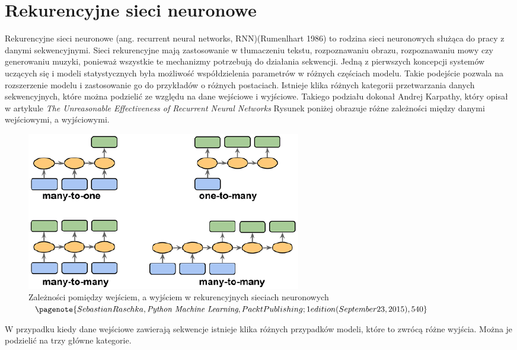 	\section{Rekurencyjne sieci neuronowe}

	Rekurencyjne sieci neuronowe (ang. recurrent neural networks, RNN)(Rumenlhart 1986) to rodzina sieci neuronowych służąca do pracy z danymi sekwencyjnymi. Sieci rekurencyjne mają zastosowanie w tłumaczeniu tekstu, rozpoznawaniu obrazu, rozpoznawaniu mowy czy generowaniu muzyki, ponieważ wszystkie te mechanizmy potrzebują do działania sekwencji. Jedną z pierwszych koncepcji systemów uczących się i modeli statystycznych była możliwość współdzielenia parametrów w różnych częściach modelu. Takie podejście pozwala na rozszerzenie modelu i zastosowanie go do przykładów o różnych postaciach. Istnieje klika różnych kategorii przetwarzania danych sekwencyjnych, które można podzielić ze względu na dane wejściowe i wyjściowe. Takiego podziału dokonał Andrej Karpathy, który opisał w artykule \textit{The Unreasonable Effectiveness of Recurrent Neural Networks} Rysunek poniżej obrazuje różne zależności między danymi wejściowymi, a wyjściowymi. 
	
	\begin{figure}[H]
		\centering
		\includegraphics[width=0.7\linewidth]{relacje}
		\caption{Zależności pomiędzy wejściem, a wyjściem w rekurencyjnych sieciach neuronowych $\pagenote{Sebastian Raschka, \textit{Python Machine Learning}, Packt Publishing; 1 edition (September 23, 2015), 540}$}
		\label{fig:relacje}
	\end{figure}
	
	W przypadku kiedy dane wejściowe zawierają sekwencje istnieje klika różnych przypadków modeli, które to zwrócą różne wyjścia. Można je podzielić na trzy główne kategorie.
	
